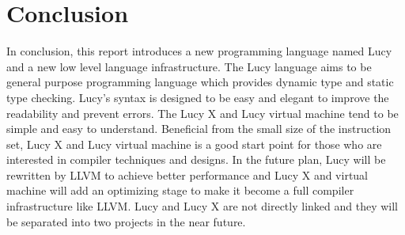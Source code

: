 \chapter{Conclusion}

In conclusion, this report introduces a new programming language named Lucy and a new low level language infrastructure. The Lucy language aims to be general purpose programming language which provides dynamic type and static type checking. Lucy's syntax is designed to be easy and elegant to improve the readability and prevent errors. The Lucy X and Lucy virtual machine tend to be simple and easy to understand. Beneficial from the small size of the instruction set, Lucy X and Lucy virtual machine is a good start point for those who are interested in compiler techniques and designs. In the future plan, Lucy will be rewritten by LLVM to achieve better performance and Lucy X and virtual machine will add an optimizing stage to make it become a full compiler infrastructure like LLVM. Lucy and Lucy X are not directly linked and they will be separated into two projects in the near future.
